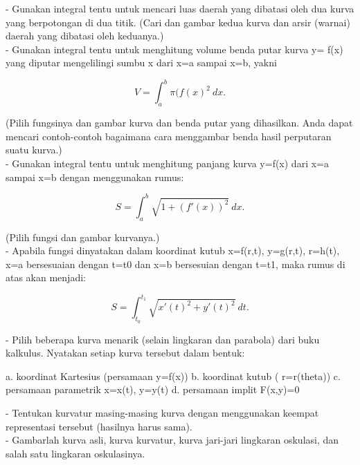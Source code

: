\documentclass[a4paper,10pt]{article}
\begin{document}
\begin{eulernotebook}
\begin{eulercomment}
\begin{eulercomment}
\begin{eulercomment}
\begin{eulercomment}
\begin{eulercomment}
\begin{eulercomment}
\begin{eulercomment}
\begin{eulercomment}
\begin{eulercomment}
- Gunakan integral tentu untuk mencari luas daerah yang dibatasi oleh
dua kurva yang berpotongan di dua titik. (Cari dan gambar kedua kurva
dan arsir (warnai) daerah yang dibatasi oleh keduanya.)\\
- Gunakan integral tentu untuk menghitung volume benda putar kurva y=
f(x) yang diputar mengelilingi sumbu x dari x=a sampai x=b, yakni

\end{eulercomment}
\begin{eulerformula}
\[
V = \int_a^b \pi (f(x)^2\ dx.
\]
\end{eulerformula}
\begin{eulercomment}
(Pilih fungsinya dan gambar kurva dan benda putar yang dihasilkan.
Anda dapat mencari contoh-contoh bagaimana cara menggambar benda hasil
perputaran suatu kurva.)\\
- Gunakan integral tentu untuk menghitung panjang kurva y=f(x) dari
x=a sampai x=b dengan menggunakan rumus:

\end{eulercomment}
\begin{eulerformula}
\[
S = \int_a^b \sqrt{1+(f'(x))^2} \ dx.
\]
\end{eulerformula}
\begin{eulercomment}
(Pilih fungsi dan gambar kurvanya.)\\
- Apabila fungsi dinyatakan dalam koordinat kutub x=f(r,t), y=g(r,t),
r=h(t), x=a bersesuaian dengan t=t0 dan x=b bersesuian dengan t=t1,
maka rumus di atas akan menjadi:

\end{eulercomment}
\begin{eulerformula}
\[
S=\int_{t_0}^{t_1} \sqrt{x'(t)^2+y'(t)^2}\ dt.
\]
\end{eulerformula}
\begin{eulercomment}
- Pilih beberapa kurva menarik (selain lingkaran dan parabola) dari
buku  kalkulus. Nyatakan setiap kurva tersebut dalam bentuk:\\
\end{eulercomment}
\begin{eulerttcomment}
  a. koordinat Kartesius (persamaan y=f(x))
  b. koordinat kutub ( r=r(theta))
  c. persamaan parametrik x=x(t), y=y(t)
  d. persamaan implit F(x,y)=0
\end{eulerttcomment}
\begin{eulercomment}
- Tentukan kurvatur masing-masing kurva dengan menggunakan keempat
representasi tersebut (hasilnya harus sama).\\
- Gambarlah kurva asli, kurva kurvatur, kurva jari-jari lingkaran
oskulasi, dan salah satu lingkaran oskulasinya.


\end{eulercomment}
\end{eulercomment}
\end{eulercomment}
\end{eulercomment}
\end{eulercomment}
\end{eulercomment}
\end{eulercomment}
\end{eulercomment}
\end{eulercomment}
\end{eulernotebook}
\end{document}
